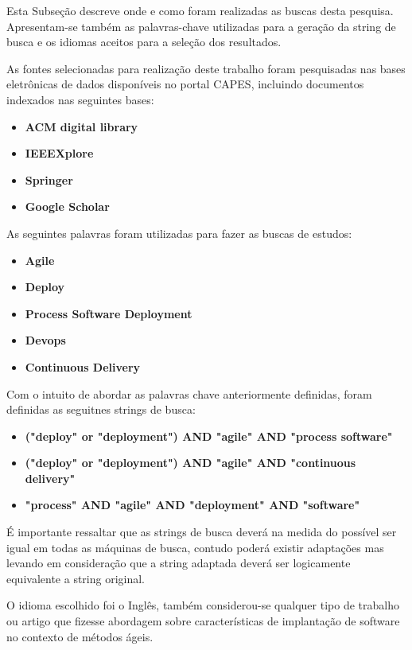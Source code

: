 \documentclass[12pt]{article}
\begin{document}
Esta  Subseção  descreve  onde  e  como  foram  realizadas
as  buscas  desta  pesquisa. Apresentam-se também as palavras-chave utilizadas para a geração da string  de busca e os idiomas aceitos para a seleção dos resultados. 

As fontes selecionadas para realização deste trabalho foram pesquisadas nas bases eletrônicas de dados disponíveis no portal CAPES, incluindo documentos indexados nas seguintes bases:

 \begin{itemize}
   \item  \textbf{ACM digital library}
   \item  \textbf{IEEEXplore}
   \item  \textbf{Springer}
   \item  \textbf{Google Scholar}
 \end{itemize}
 
As seguintes palavras foram utilizadas para fazer as buscas de estudos:

 \begin{itemize}
   \item  \textbf{Agile}
   \item  \textbf{Deploy}
   \item  \textbf{Process Software Deployment}
   \item  \textbf{Devops}
   \item  \textbf{Continuous Delivery}
 \end{itemize}

Com o intuito de abordar as palavras chave anteriormente definidas, foram definidas as seguitnes strings de busca:

 \begin{itemize}
   \item  \textbf{("deploy" or "deployment") AND  "agile" AND "process software" }
    \item  \textbf{("deploy" or "deployment") AND  "agile" AND "continuous delivery"}
    \item  \textbf{ "process" AND  "agile" AND  "deployment" AND "software"}
 \end{itemize}

É importante ressaltar que as strings de busca deverá na medida do possível ser igual em todas as máquinas de busca, contudo poderá existir adaptações mas levando em consideração que a string adaptada deverá ser logicamente equivalente a string original.

O idioma escolhido foi o Inglês, também considerou-se qualquer tipo de trabalho ou artigo que fizesse abordagem sobre características de implantação de software no contexto de métodos ágeis.
   
\end{document}
